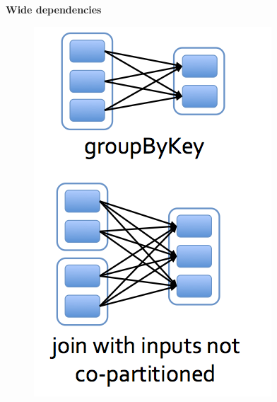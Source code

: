 {\begin{columns}[t, onlytextwidth]
	\begin{column}[T]{.4\textwidth}
		\begin{center}
			{ \tiny \bf Wide dependencies}
		\end{center}
		\begin{figure}[h]
			\includegraphics[scale=0.3]{./Figures/wide_deps}
		\end{figure}
	\end{column}
\end{columns}
}

